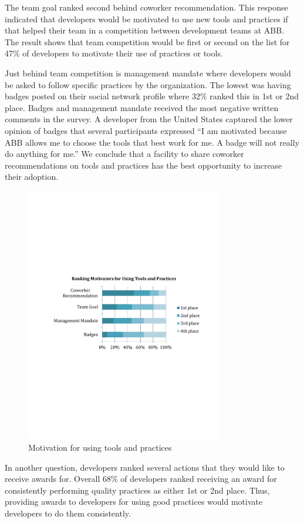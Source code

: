 \documentclass{sig-alternate}
\begin{document}
The team goal ranked second behind coworker recommendation.  This response indicated that developers would be motivated to use new tools and practices if that helped their team in a competition between development teams at ABB.  The result shows that team competition would be first or second on the list for 47\% of developers to motivate their use of practices or tools.  

Just behind team competition is management mandate where developers would be asked to follow specific practices by the organization.  The lowest was having badges posted on their social network profile where 32\% ranked this in 1st or 2nd place.   Badges and management mandate received the most negative written comments in the survey.  A developer from the United States captured the lower opinion of badges that several participants expressed ``I am motivated because ABB allows me to choose the tools that best work for me. A badge will not really do anything for me.''  We conclude that a facility to share coworker recommendations on tools and practices has the best opportunity to increase their adoption.  
 
\begin{figure}
	\includegraphics[width=3.4in]{ToolAndPracticeMotivators.pdf}
	\caption{Motivation for using tools and practices}
	\label{fig:toolandpracticemotivators}
\end{figure}

In another question, developers ranked several actions that they would like to receive awards for.  Overall 68\% of developers ranked receiving an award for consistently performing quality practices as either 1st or 2nd place.  Thus, providing awards to developers for using good practices would motivate developers to do them consistently.
\end{document}
